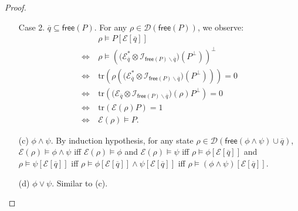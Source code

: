 \documentclass[conference,compsoc, 10pt]{IEEEtran}
\newcommand {\qbar} {{\overline{q}}}
\newcommand {\cD } {{\mathcal{D}}}
\newcommand {\cE } {{\mathcal{E}}}
\newcommand {\cI } {{\mathcal{I}}}
\newcommand {\free }[1] {{\mathsf{free}\left(#1\right)}}
\newcommand {\tr } {{\mathrm{tr}}}
\begin{document}
\begin{appendices}
\begin{proof}
\begin{enumerate}
				Case 2. $\qbar\subseteq\free{P}$. For any $\rho\in\cD(\free{P})$, we observe:
				\begin{align*}
				&\rho\models P[\cE[\qbar]] \\
				\Longleftrightarrow\ & \rho\models\left(\big(\cE^\ast_{\qbar}\otimes\cI_{\free{P}\backslash\qbar}\big)(P^\bot)\right)^\bot \\
				\Longleftrightarrow\ & \tr\left(\rho \left(\big(\cE^\ast_{\qbar}\otimes\cI_{\free{P}\backslash\qbar}\big)(P^\bot)\right)\right) = 0 \\
				\Longleftrightarrow\ & \tr\left(\big(\cE_{\qbar}\otimes\cI_{\free{P}\backslash\qbar}\big)(\rho) P^\bot\right) = 0 \\
				\Longleftrightarrow\ &
				\tr(\cE(\rho) P) = 1\\
				\Longleftrightarrow\ &\cE(\rho)\models P.		
				\end{align*}
				
				
				
				\item[(c)] $\phi\wedge\psi$. By induction hypothesis, for any state $\rho\in\cD(\free{\phi\wedge\psi}\cup\qbar)$, $\cE(\rho)\models\phi\wedge\psi$ iff $\cE(\rho)\models\phi$ and $\cE(\rho)\models\psi$ iff $\rho\models \phi[\cE[\qbar]]$ and $\rho\models \psi[\cE[\qbar]]$ iff $\rho\models \phi[\cE[\qbar]]\wedge\psi[\cE[\qbar]]$ iff $\rho\models (\phi\wedge\psi)[\cE[\qbar]]$.
				\item[(d)] $\phi\vee\psi$. Similar to (c).
			\end{enumerate}
		\end{proof}
		
		

\end{appendices}
\end{document}
